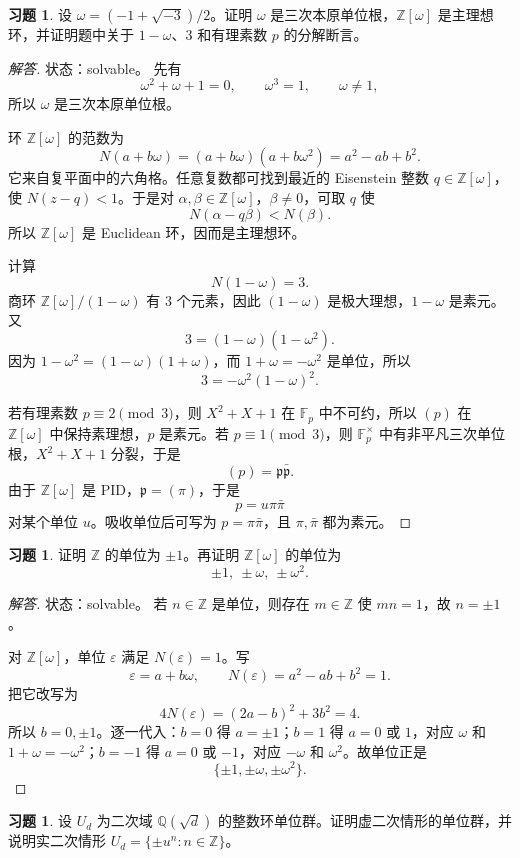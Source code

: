 \documentclass[11pt,a4paper,openany]{ctexbook}
\numberwithin{equation}{chapter}
\newcommand{\Q}{\mathbb{Q}}
\newcommand{\Z}{\mathbb{Z}}
\newcommand{\F}{\mathbb{F}}
\theoremstyle{plain}
\theoremstyle{definition}
\newtheorem{exercise}[theorem]{习题}
\theoremstyle{remark}
\begin{document}
\begin{exercise}
设 $\omega=(-1+\sqrt{-3})/2$。证明 $\omega$ 是三次本原单位根，$\Z[\omega]$ 是主理想环，并证明题中关于 $1-\omega$、$3$ 和有理素数 $p$ 的分解断言。
\end{exercise}

\begin{proof}[解答]
状态：solvable。
先有
\[
\omega^2+\omega+1=0,\qquad \omega^3=1,\qquad \omega\ne1,
\]
所以 $\omega$ 是三次本原单位根。

环 $\Z[\omega]$ 的范数为
\[
N(a+b\omega)=(a+b\omega)(a+b\omega^2)=a^2-ab+b^2.
\]
它来自复平面中的六角格。任意复数都可找到最近的 Eisenstein 整数 $q\in\Z[\omega]$，使 $N(z-q)<1$。于是对 $\alpha,\beta\in\Z[\omega]$，$\beta\ne0$，可取 $q$ 使
\[
N(\alpha-q\beta)<N(\beta).
\]
所以 $\Z[\omega]$ 是 Euclidean 环，因而是主理想环。

计算
\[
N(1-\omega)=3.
\]
商环 $\Z[\omega]/(1-\omega)$ 有 $3$ 个元素，因此 $(1-\omega)$ 是极大理想，$1-\omega$ 是素元。又
\[
3=(1-\omega)(1-\omega^2).
\]
因为 $1-\omega^2=(1-\omega)(1+\omega)$，而 $1+\omega=-\omega^2$ 是单位，所以
\[
3=-\omega^2(1-\omega)^2.
\]

若有理素数 $p\equiv2\pmod3$，则 $X^2+X+1$ 在 $\F_p$ 中不可约，所以 $(p)$ 在 $\Z[\omega]$ 中保持素理想，$p$ 是素元。若 $p\equiv1\pmod3$，则 $\F_p^\times$ 中有非平凡三次单位根，$X^2+X+1$ 分裂，于是
\[
(p)=\mathfrak p\bar{\mathfrak p}.
\]
由于 $\Z[\omega]$ 是 PID，$\mathfrak p=(\pi)$，于是
\[
p=u\pi\bar\pi
\]
对某个单位 $u$。吸收单位后可写为 $p=\pi\bar\pi$，且 $\pi,\bar\pi$ 都为素元。
\end{proof}

\begin{exercise}
证明 $\Z$ 的单位为 $\pm1$。再证明 $\Z[\omega]$ 的单位为
\[
\pm1,\ \pm\omega,\ \pm\omega^2.
\]
\end{exercise}

\begin{proof}[解答]
状态：solvable。
若 $n\in\Z$ 是单位，则存在 $m\in\Z$ 使 $mn=1$，故 $n=\pm1$。

对 $\Z[\omega]$，单位 $\varepsilon$ 满足 $N(\varepsilon)=1$。写
\[
\varepsilon=a+b\omega,\qquad N(\varepsilon)=a^2-ab+b^2=1.
\]
把它改写为
\[
4N(\varepsilon)=(2a-b)^2+3b^2=4.
\]
所以 $b=0,\pm1$。逐一代入：$b=0$ 得 $a=\pm1$；$b=1$ 得 $a=0$ 或 $1$，对应 $\omega$ 和 $1+\omega=-\omega^2$；$b=-1$ 得 $a=0$ 或 $-1$，对应 $-\omega$ 和 $\omega^2$。故单位正是
\[
\{\pm1,\pm\omega,\pm\omega^2\}.
\]
\end{proof}

\begin{exercise}
设 $U_d$ 为二次域 $\Q(\sqrt d)$ 的整数环单位群。证明虚二次情形的单位群，并说明实二次情形 $U_d=\{\pm u^n:n\in\Z\}$。
\end{exercise}
\end{document}
